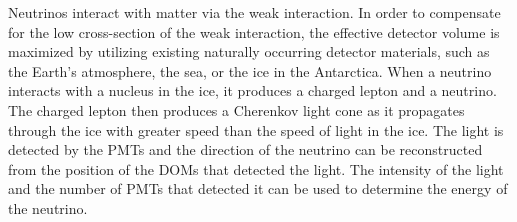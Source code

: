 Neutrinos interact with matter via the weak interaction.
In order to compensate for the low cross-section of the weak interaction,
  the effective detector volume is maximized by utilizing existing naturally occurring detector materials,
  such as
    the Earth's atmosphere,
    the sea,
    or the ice in the Antarctica.
%
When a neutrino interacts with a nucleus in the ice,
it produces a charged lepton and a neutrino.
The charged lepton then produces a Cherenkov light cone
as it propagates through the ice
with greater speed than the speed of light in the ice.
The light is detected by the \acp{PMT}
  and the direction of the neutrino can be reconstructed
    from the position of the \acp{DOM}
      that detected the light.
The intensity of the light and the number of \acp{PMT} that detected it
  can be used to determine the energy of the neutrino.

